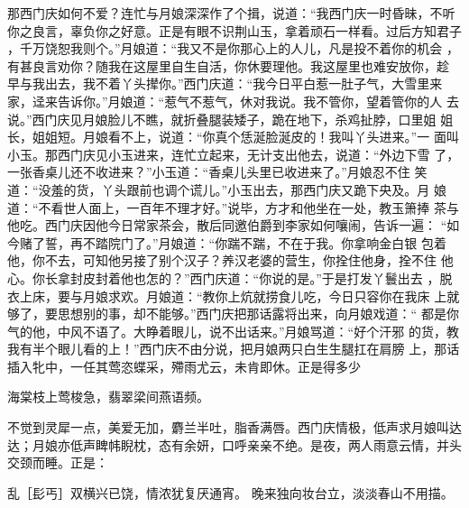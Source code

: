 那西门庆如何不爱？连忙与月娘深深作了个揖，说道：“我西门庆一时昏昧，不听
你之良言，辜负你之好意。正是有眼不识荆山玉，拿着顽石一样看。过后方知君子
，千万饶恕我则个。”月娘道：“我又不是你那心上的人儿，凡是投不着你的机会
，有甚良言劝你？随我在这屋里自生自活，你休要理他。我这屋里也难安放你，趁
早与我出去，我不着丫头撵你。”西门庆道：“我今日平白惹一肚子气，大雪里来
家，迳来告诉你。”月娘道：“惹气不惹气，休对我说。我不管你，望着管你的人
去说。”西门庆见月娘脸儿不瞧，就折叠腿装矮子，跪在地下，杀鸡扯脖，口里姐
姐长，姐姐短。月娘看不上，说道：“你真个恁涎脸涎皮的！我叫丫头进来。”一
面叫小玉。那西门庆见小玉进来，连忙立起来，无计支出他去，说道：“外边下雪
了，一张香桌儿还不收进来？”小玉道：“香桌儿头里已收进来了。”月娘忍不住
笑道：“没羞的货，丫头跟前也调个谎儿。”小玉出去，那西门庆又跪下央及。月
娘道：“不看世人面上，一百年不理才好。”说毕，方才和他坐在一处，教玉箫捧
茶与他吃。西门庆因他今日常家茶会，散后同邀伯爵到李家如何嚷闹，告诉一遍：
“如今赌了誓，再不踏院门了。”月娘道：“你踹不踹，不在于我。你拿响金白银
包着他，你不去，可知他另接了别个汉子？养汉老婆的营生，你拴住他身，拴不住
他心。你长拿封皮封着他也怎的？”西门庆道：“你说的是。”于是打发丫鬟出去
，脱衣上床，要与月娘求欢。月娘道：“教你上炕就捞食儿吃，今日只容你在我床
上就够了，要思想别的事，却不能够。”西门庆把那话露将出来，向月娘戏道：“
都是你气的他，中风不语了。大睁着眼儿，说不出话来。”月娘骂道：“好个汗邪
的货，教我有半个眼儿看的上！”西门庆不由分说，把月娘两只白生生腿扛在肩膀
上，那话插入牝中，一任其莺恣蝶采，殢雨尤云，未肯即休。正是得多少

海棠枝上莺梭急，翡翠梁间燕语频。

不觉到灵犀一点，美爱无加，麝兰半吐，脂香满唇。西门庆情极，低声求月娘叫达
达；月娘亦低声睥帏睨枕，态有余妍，口呼亲亲不绝。是夜，两人雨意云情，并头
交颈而睡。正是：

乱［髟丐］双横兴已饶，情浓犹复厌通宵。
晚来独向妆台立，淡淡春山不用描。

